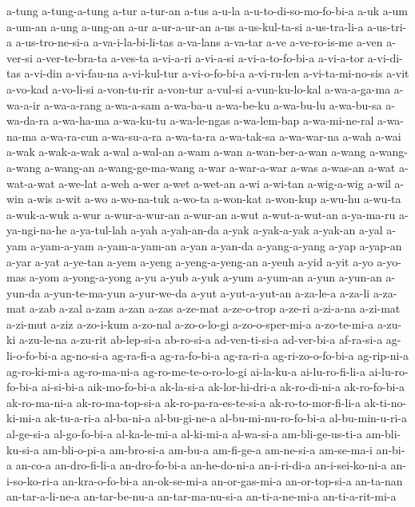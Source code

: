 {a-tung a-tung-a-tung a-tur a-tur-an a-tus a-u-la a-u-to-di-so-mo-fo-bi-a
a-uk a-um a-um-an a-ung a-ung-an a-ur a-ur-a-ur-an a-us a-us-kul-ta-si
a-us-tra-li-a a-us-tri-a a-us-tro-ne-si-a a-va-i-la-bi-li-tas a-va-lans
a-va-tar a-ve a-ve-ro-is-me a-ven a-ver-si a-ver-te-bra-ta a-ves-ta
a-vi-a-ri a-vi-a-si a-vi-a-to-fo-bi-a a-vi-a-tor a-vi-di-tas a-vi-din
a-vi-fau-na a-vi-kul-tur a-vi-o-fo-bi-a a-vi-ru-len a-vi-ta-mi-no-sis
a-vit a-vo-kad a-vo-li-si a-von-tu-rir a-von-tur a-vul-si a-vun-ku-lo-kal
a-wa-a-ga-ma a-wa-a-ir a-wa-a-rang a-wa-a-sam a-wa-ba-u a-wa-be-ku
a-wa-bu-lu a-wa-bu-sa a-wa-da-ra a-wa-ha-ma a-wa-ku-tu a-wa-le-ngas
a-wa-lem-bap a-wa-mi-ne-ral a-wa-na-ma a-wa-ra-cun a-wa-su-a-ra a-wa-ta-ra
a-wa-tak-sa a-wa-war-na a-wah a-wai a-wak a-wak-a-wak a-wal a-wal-an a-wam
a-wan a-wan-ber-a-wan a-wang a-wang-a-wang a-wang-an a-wang-ge-ma-wang
a-war a-war-a-war a-was a-was-an a-wat a-wat-a-wat a-we-lat a-weh a-wer
a-wet a-wet-an a-wi a-wi-tan a-wig-a-wig a-wil a-win a-wis a-wit a-wo
a-wo-na-tuk a-wo-ta a-won-kat a-won-kup a-wu-hu a-wu-ta a-wuk-a-wuk a-wur
a-wur-a-wur-an a-wur-an a-wut a-wut-a-wut-an a-ya-ma-ru a-ya-ngi-na-he
a-ya-tul-lah a-yah a-yah-an-da a-yak a-yak-a-yak a-yak-an a-yal a-yam
a-yam-a-yam a-yam-a-yam-an a-yan a-yan-da a-yang-a-yang a-yap a-yap-an
a-yar a-yat a-ye-tan a-yem a-yeng a-yeng-a-yeng-an a-yeuh a-yid a-yit a-yo
a-yo-mas a-yom a-yong-a-yong a-yu a-yub a-yuk a-yum a-yum-an a-yun
a-yun-an a-yun-da a-yun-te-ma-yun a-yur-we-da a-yut a-yut-a-yut-an
a-za-le-a a-za-li a-za-mat a-zab a-zal a-zam a-zan a-zas a-ze-mat
a-ze-o-trop a-ze-ri a-zi-a-na a-zi-mat a-zi-mut a-ziz a-zo-i-kum a-zo-nal
a-zo-o-lo-gi a-zo-o-sper-mi-a a-zo-te-mi-a a-zu-ki a-zu-le-na a-zu-rit
ab-lep-si-a ab-ro-si-a ad-ven-ti-si-a ad-ver-bi-a af-ra-si-a
ag-li-o-fo-bi-a ag-no-si-a ag-ra-fi-a ag-ra-fo-bi-a ag-ra-ri-a
ag-ri-zo-o-fo-bi-a ag-rip-ni-a ag-ro-ki-mi-a ag-ro-ma-ni-a
ag-ro-me-te-o-ro-lo-gi ai-la-ku-a ai-lu-ro-fi-li-a ai-lu-ro-fo-bi-a
ai-si-bi-a aik-mo-fo-bi-a ak-la-si-a ak-lor-hi-dri-a ak-ro-di-ni-a
ak-ro-fo-bi-a ak-ro-ma-ni-a ak-ro-ma-top-si-a ak-ro-pa-ra-es-te-si-a
ak-ro-to-mor-fi-li-a ak-ti-no-ki-mi-a ak-tu-a-ri-a al-ba-ni-a
al-bu-gi-ne-a al-bu-mi-nu-ro-fo-bi-a al-bu-min-u-ri-a al-ge-si-a
al-go-fo-bi-a al-ka-le-mi-a al-ki-mi-a al-wa-si-a am-bli-ge-us-ti-a
am-bli-ku-si-a am-bli-o-pi-a am-bro-si-a am-bu-a am-fi-ge-a am-ne-si-a
am-se-ma-i an-bi-a an-co-a an-dro-fi-li-a an-dro-fo-bi-a an-he-do-ni-a
an-i-ri-di-a an-i-sei-ko-ni-a an-i-so-ko-ri-a an-kra-o-fo-bi-a
an-ok-se-mi-a an-or-gas-mi-a an-or-top-si-a an-ta-nan an-tar-a-li-ne-a
an-tar-be-nu-a an-tar-ma-nu-si-a an-ti-a-ne-mi-a an-ti-a-rit-mi-a
}
